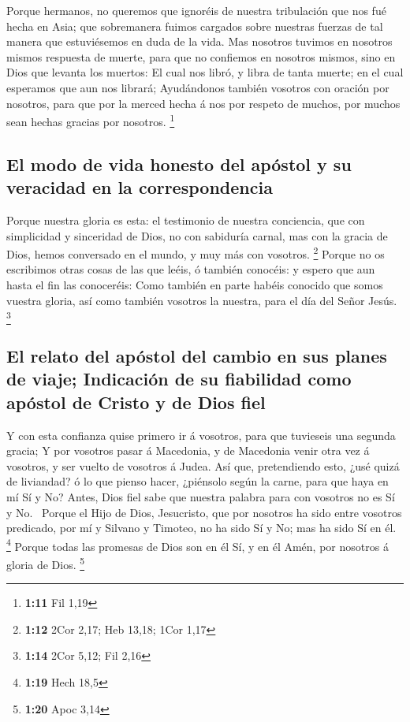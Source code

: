  Porque hermanos, no queremos que ignoréis de nuestra
tribulación que nos fué hecha en Asia; que sobremanera fuimos cargados
sobre nuestras fuerzas de tal manera que estuviésemos en duda de la
vida.  Mas nosotros tuvimos en nosotros mismos respuesta
de muerte, para que no confiemos en nosotros mismos, sino en Dios que
levanta los muertos:  El cual nos libró, y libra de tanta
muerte; en el cual esperamos que aun nos librará; 
Ayudándonos también vosotros con oración por nosotros, para que por la
merced hecha á nos por respeto de muchos, por muchos sean hechas gracias
por nosotros. \footnote{\textbf{1:11} Fil 1,19}

\hypertarget{el-modo-de-vida-honesto-del-apuxf3stol-y-su-veracidad-en-la-correspondencia}{%
\subsection{El modo de vida honesto del apóstol y su veracidad en la
correspondencia}\label{el-modo-de-vida-honesto-del-apuxf3stol-y-su-veracidad-en-la-correspondencia}}

 Porque nuestra gloria es esta: el testimonio de nuestra
conciencia, que con simplicidad y sinceridad de Dios, no con sabiduría
carnal, mas con la gracia de Dios, hemos conversado en el mundo, y muy
más con vosotros. \footnote{\textbf{1:12} 2Cor 2,17; Heb 13,18; 1Cor
  1,17}  Porque no os escribimos otras cosas de las que
leéis, ó también conocéis: y espero que aun hasta el fin las conoceréis:
 Como también en parte habéis conocido que somos vuestra
gloria, así como también vosotros la nuestra, para el día del Señor
Jesús. \footnote{\textbf{1:14} 2Cor 5,12; Fil 2,16}

\hypertarget{el-relato-del-apuxf3stol-del-cambio-en-sus-planes-de-viaje-indicaciuxf3n-de-su-fiabilidad-como-apuxf3stol-de-cristo-y-de-dios-fiel}{%
\subsection{El relato del apóstol del cambio en sus planes de viaje;
Indicación de su fiabilidad como apóstol de Cristo y de Dios
fiel}\label{el-relato-del-apuxf3stol-del-cambio-en-sus-planes-de-viaje-indicaciuxf3n-de-su-fiabilidad-como-apuxf3stol-de-cristo-y-de-dios-fiel}}

 Y con esta confianza quise primero ir á vosotros, para
que tuvieseis una segunda gracia;  Y por vosotros pasar á
Macedonia, y de Macedonia venir otra vez á vosotros, y ser vuelto de
vosotros á Judea.  Así que, pretendiendo esto, ¿usé quizá
de liviandad? ó lo que pienso hacer, ¿piénsolo según la carne, para que
haya en mí Sí y No?  Antes, Dios fiel sabe que nuestra
palabra para con vosotros no es Sí y No.~ Porque el Hijo
de Dios, Jesucristo, que por nosotros ha sido entre vosotros predicado,
por mí y Silvano y Timoteo, no ha sido Sí y No; mas ha sido Sí en él.
\footnote{\textbf{1:19} Hech 18,5}  Porque todas las
promesas de Dios son en él Sí, y en él Amén, por nosotros á gloria de
Dios. \footnote{\textbf{1:20} Apoc 3,14}

